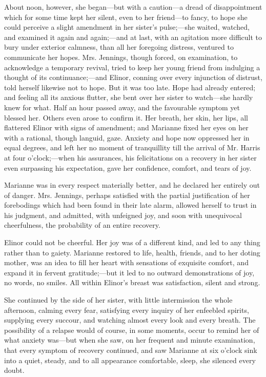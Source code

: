 About noon, however, she began---but with a caution---a dread of disappointment which for some time kept her silent, even to her friend---to fancy, to hope she could perceive a slight amendment in her sister's pulse;---she waited, watched, and examined it again and again;---and at last, with an agitation more difficult to bury under exterior calmness, than all her foregoing distress, ventured to communicate her hopes. Mrs. Jennings, though forced, on examination, to acknowledge a temporary revival, tried to keep her young friend from indulging a thought of its continuance;---and Elinor, conning over every injunction of distrust, told herself likewise not to hope. But it was too late. Hope had already entered; and feeling all its anxious flutter, she bent over her sister to watch---she hardly knew for what. Half an hour passed away, and the favourable symptom yet blessed her. Others even arose to confirm it. Her breath, her skin, her lips, all flattered Elinor with signs of amendment; and Marianne fixed her eyes on her with a rational, though languid, gaze. Anxiety and hope now oppressed her in equal degrees, and left her no moment of tranquillity till the arrival of Mr. Harris at four o'clock;---when his assurances, his felicitations on a recovery in her sister even surpassing his expectation, gave her confidence, comfort, and tears of joy.

Marianne was in every respect materially better, and he declared her entirely out of danger. Mrs. Jennings, perhaps satisfied with the partial justification of her forebodings which had been found in their late alarm, allowed herself to trust in his judgment, and admitted, with unfeigned joy, and soon with unequivocal cheerfulness, the probability of an entire recovery.

Elinor could not be cheerful. Her joy was of a different kind, and led to any thing rather than to gaiety. Marianne restored to life, health, friends, and to her doting mother, was an idea to fill her heart with sensations of exquisite comfort, and expand it in fervent gratitude;---but it led to no outward demonstrations of joy, no words, no smiles. All within Elinor's breast was satisfaction, silent and strong.

She continued by the side of her sister, with little intermission the whole afternoon, calming every fear, satisfying every inquiry of her enfeebled spirits, supplying every succour, and watching almost every look and every breath. The possibility of a relapse would of course, in some moments, occur to remind her of what anxiety was---but when she saw, on her frequent and minute examination, that every symptom of recovery continued, and saw Marianne at six o'clock sink into a quiet, steady, and to all appearance comfortable, sleep, she silenced every doubt.

